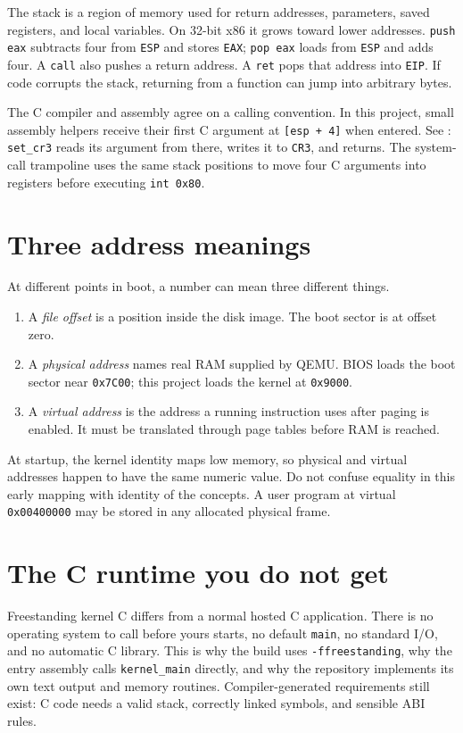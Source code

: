 The stack is a region of memory used for return addresses, parameters, saved registers, and local variables. On 32-bit x86 it grows toward lower addresses. \texttt{push eax} subtracts four from \texttt{ESP} and stores \texttt{EAX}; \texttt{pop eax} loads from \texttt{ESP} and adds four. A \texttt{call} also pushes a return address. A \texttt{ret} pops that address into \texttt{EIP}. If code corrupts the stack, returning from a function can jump into arbitrary bytes.

The C compiler and assembly agree on a calling convention. In this project, small assembly helpers receive their first C argument at \texttt{[esp + 4]} when entered. See : \texttt{set\_cr3} reads its argument from there, writes it to \texttt{CR3}, and returns. The system-call trampoline uses the same stack positions to move four C arguments into registers before executing \texttt{int 0x80}.

\section{Three address meanings}
At different points in boot, a number can mean three different things.
\begin{enumerate}
\item A \emph{file offset} is a position inside the disk image. The boot sector is at offset zero.
\item A \emph{physical address} names real RAM supplied by QEMU. BIOS loads the boot sector near \texttt{0x7C00}; this project loads the kernel at \texttt{0x9000}.
\item A \emph{virtual address} is the address a running instruction uses after paging is enabled. It must be translated through page tables before RAM is reached.
\end{enumerate}
At startup, the kernel identity maps low memory, so physical and virtual addresses happen to have the same numeric value. Do not confuse equality in this early mapping with identity of the concepts. A user program at virtual \texttt{0x00400000} may be stored in any allocated physical frame.

\section{The C runtime you do not get}
Freestanding kernel C differs from a normal hosted C application. There is no operating system to call before yours starts, no default \texttt{main}, no standard I/O, and no automatic C library. This is why the build uses \texttt{-ffreestanding}, why the entry assembly calls \texttt{kernel\_main} directly, and why the repository implements its own text output and memory routines. Compiler-generated requirements still exist: C code needs a valid stack, correctly linked symbols, and sensible ABI rules.

